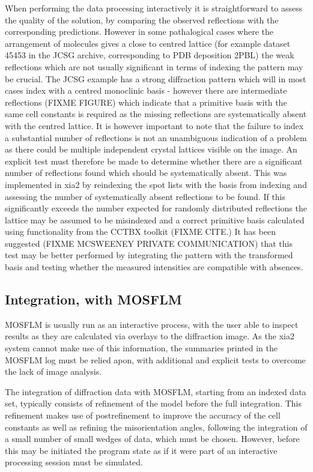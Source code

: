 \documentclass[a4paper, 11pt]{article}
\begin{document}
When performing the data processing interactively it is straightforward to assess the quality of the solution, by comparing the observed reflections with the corresponding predictions. However in some pathalogical cases where the arrangement of molecules gives a close to centred lattice (for example dataset 45453 in the JCSG archive, corresponding to PDB deposition 2PBL) the weak reflections which are not usually significant in terms of indexing the pattern may be crucial. The JCSG example has a strong diffraction pattern which will in most cases index with a centred monoclinic basis - however there are intermediate reflections (FIXME FIGURE) which indicate that a primitive basis with the same cell constants is required as the missing reflections are systematically absent with the centred lattice. It is however important to note that the failure to index a substantial number of reflections is not an unambiguous indication of a problem as there could be multiple independent crystal lattices visible on the image. An explicit test must therefore be made to determine whether there are a significant number of reflections found which should be systematically absent. This was implemented in xia2 by reindexing the spot lists with the basis from indexing and assessing the number of systematically absent reflections to be found. If this significantly exceeds the number expected for randomly distributed reflections the lattice may be assumed to be misindexed and a correct primitive basis calculated using functionality from the CCTBX toolkit (FIXME CITE.) It has been suggested (FIXME MCSWEENEY PRIVATE COMMUNICATION) that this test may be better performed by integrating the pattern with the transformed basis and testing whether the measured intensities are compatible with absences.

\subsection{Integration, with MOSFLM}

MOSFLM is usually run as an interactive process, with the user able to inspect results as they are calculated via overlays to the diffraction image. As the xia2 system cannot make use of this information, the summaries printed in the MOSFLM log must be relied apon, with additional and explicit tests to overcome the lack of image analysis.

The integration of diffraction data with MOSFLM, starting from an indexed data set, typically consists of refinement of the model before the full integration. This refinement makes use of postrefinement to improve the accuracy of the cell constants as well as refining the misorientation angles, following the integration of a small number of small wedges of data, which must be chosen. However, before this may be initiated the program state as if it were part of an interactive processing session must be simulated.
\end{document}
